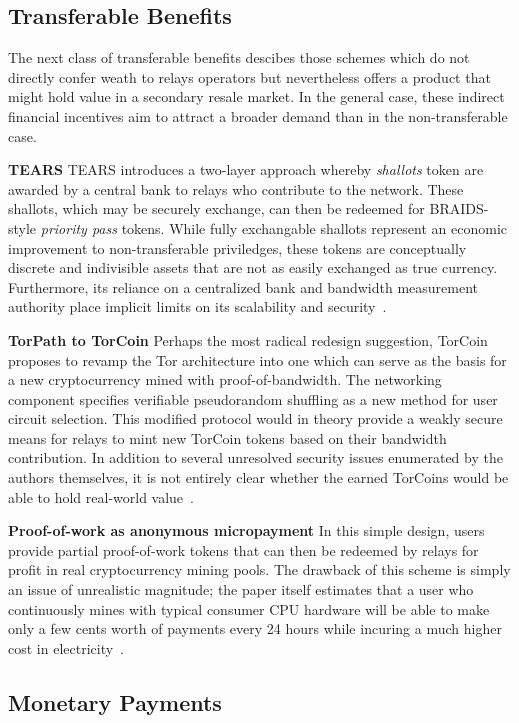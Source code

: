 \subsection{Transferable Benefits}

The next class of transferable benefits descibes those schemes which do not
directly confer weath to relays operators but nevertheless offers a product that
might hold value in a secondary resale market. In the general case, these
indirect financial incentives aim to attract a broader demand than in the
non-transferable case.

\textbf{TEARS} TEARS introduces a two-layer approach whereby \emph{shallots}
token are awarded by a central bank to relays who contribute to the
network. These shallots, which may be securely exchange, can then be redeemed
for BRAIDS-style \emph{priority pass} tokens. While fully exchangable shallots
represent an economic improvement to non-transferable priviledges, these tokens
are conceptually discrete and indivisible assets that are not as easily
exchanged as true currency. Furthermore, its reliance on a centralized bank and
bandwidth measurement authority place implicit limits on its scalability and
security~\cite{jansen2010recruiting}.

\textbf{TorPath to TorCoin} Perhaps the most radical redesign suggestion,
TorCoin proposes to revamp the Tor architecture into one which can serve as the
basis for a new cryptocurrency mined with proof-of-bandwidth. The networking
component specifies verifiable pseudorandom shuffling as a new method for user
circuit selection. This modified protocol would in theory provide a weakly
secure means for relays to mint new TorCoin tokens based on their bandwidth
contribution. In addition to several unresolved security issues enumerated by
the authors themselves, it is not entirely clear whether the earned TorCoins
would be able to hold real-world value~\cite{ghosh2014torpath}.

\textbf{Proof-of-work as anonymous micropayment} In this simple design, users
provide partial proof-of-work tokens that can then be redeemed by relays for
profit in real cryptocurrency mining pools. The drawback of this scheme is
simply an issue of unrealistic magnitude; the paper itself estimates that a user
who continuously mines with typical consumer CPU hardware will be able to make
only a few cents worth of payments every 24 hours while incuring a much higher
cost in electricity~\cite{biryukov2015proof}.

\subsection{Monetary Payments}

